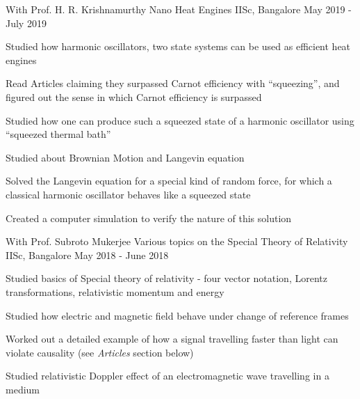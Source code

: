 

\begin{cventries}

  \cventry
    {With Prof. H. R. Krishnamurthy} %
    {Nano Heat Engines} %
    {IISc, Bangalore} %
    {May 2019 - July 2019} %
    {
      \begin{cvitems} %
        \item {Studied how harmonic oscillators, two state systems can be used as efficient heat engines}
        \item {Read Articles claiming they surpassed Carnot efficiency with ``squeezing'', and figured out the sense in which Carnot efficiency is surpassed}
        \item {Studied how one can produce such a squeezed state of a harmonic oscillator using ``squeezed thermal bath''}
        \item {Studied about Brownian Motion and Langevin equation}
        \item {Solved the Langevin equation for a special kind of random force, for which a classical harmonic oscillator behaves like a squeezed state}
        \item {Created a computer simulation to verify the nature of this solution}
      \end{cvitems}
    }

   \cventry
  {With Prof. Subroto Mukerjee} %
  {Various topics on the Special Theory of Relativity} %
  {IISc, Bangalore} %
  {May 2018 - June 2018} %
  {
  	\begin{cvitems} %
  		\item {Studied basics of Special theory of relativity - four vector notation, Lorentz transformations, relativistic momentum and energy}
  		\item {Studied how electric and magnetic field behave under change of reference frames}
  		\item {Worked out a detailed example of how a signal travelling faster than light can violate causality (see \textit{Articles} section below)}
  		\item {Studied relativistic Doppler effect of an electromagnetic wave travelling in a medium}
  	\end{cvitems}
  }

\end{cventries}
